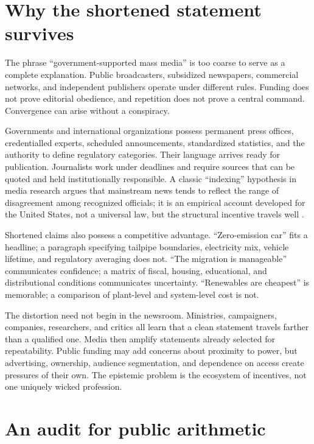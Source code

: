 ﻿\documentclass[12pt,a4paper]{book}
\begin{document}
\section{Why the shortened statement survives}

The phrase ``government-supported mass media'' is too coarse to serve as a
complete explanation.  Public broadcasters, subsidized newspapers,
commercial networks, and independent publishers operate under different
rules.  Funding does not prove editorial obedience, and repetition does not
prove a central command.  Convergence can arise without a conspiracy.

Governments and international organizations possess permanent press offices,
credentialled experts, scheduled announcements, standardized statistics, and
the authority to define regulatory categories.  Their language arrives ready
for publication.  Journalists work under deadlines and require sources that
can be quoted and held institutionally responsible.  A classic ``indexing''
hypothesis in media research argues that mainstream news tends to reflect the
range of disagreement among recognized officials; it is an empirical account
developed for the United States, not a universal law, but the structural
incentive travels well \cite{BennettPressState1990}.

Shortened claims also possess a competitive advantage.  ``Zero-emission car''
fits a headline; a paragraph specifying tailpipe boundaries, electricity mix,
vehicle lifetime, and regulatory averaging does not.  ``The migration is
manageable'' communicates confidence; a matrix of fiscal, housing,
educational, and distributional conditions communicates uncertainty.
``Renewables are cheapest'' is memorable; a comparison of plant-level and
system-level cost is not.

The distortion need not begin in the newsroom.  Ministries, campaigners,
companies, researchers, and critics all learn that a clean statement travels
farther than a qualified one.  Media then amplify statements already selected
for repeatability.  Public funding may add concerns about proximity to power,
but advertising, ownership, audience segmentation, and dependence on access
create pressures of their own.  The epistemic problem is the ecosystem of
incentives, not one uniquely wicked profession.

\section{An audit for public arithmetic}
\end{document}
